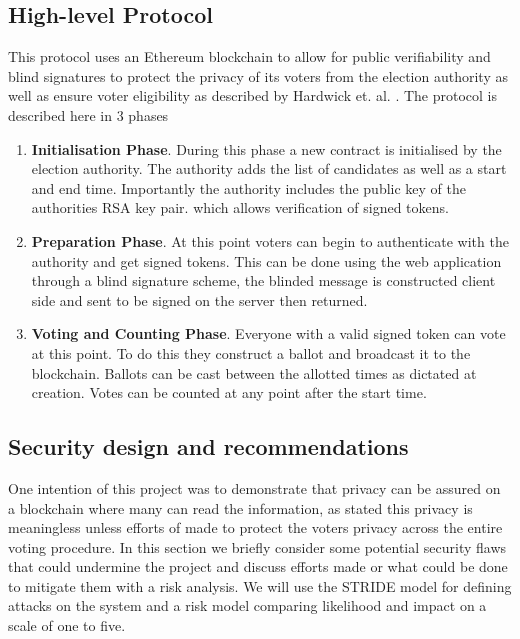 \documentclass{entcs}
\begin{document}
\subsection{High-level Protocol} 
This protocol uses an Ethereum blockchain to allow for public verifiability and blind signatures to protect the privacy of its voters from the election authority as well as ensure voter eligibility as described by Hardwick et. al. \cite{hardwick2018}. The protocol is described here in 3 phases
\begin{enumerate}
    \item \textbf{Initialisation Phase}. During this phase a new contract is initialised by the election authority. The authority adds the list of candidates as well as a start and end time. Importantly the authority includes the public key of the authorities RSA key pair. which allows verification of signed tokens.
    \item \textbf{Preparation Phase}. At this point voters can begin to authenticate with the authority and get signed tokens. This can be done using the web application through a blind signature scheme, the blinded message is constructed client side and sent to be signed on the server then returned.
    \item \textbf{Voting and Counting Phase}. Everyone with a valid signed token can vote at this point. To do this they construct a ballot and broadcast it to the blockchain. Ballots can be cast between the allotted times as dictated at creation. Votes can be counted at any point after the start time.
\end{enumerate}

\subsection{Security design and recommendations}
One intention of this project was to demonstrate that privacy can be assured on a blockchain where many can read the information, as stated this privacy is meaningless unless efforts of made to protect the voters privacy across the entire voting procedure. In this section we briefly consider some potential security flaws that could undermine the project and discuss efforts made or what could be done to mitigate them with a risk analysis. We will use the STRIDE model \cite{STRIDE} for defining attacks on the system and a risk model comparing likelihood and impact on a scale of one to five.
\end{document}
